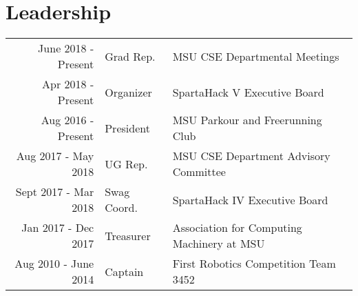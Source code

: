 \documentclass[]{deedy-resume-openfont-rileyannis}
\begin{document}
\begin{minipage}[t]{0.66\textwidth}


\section{Leadership} 

\begin{tabular}{rll}
June 2018 - Present & Grad Rep. & MSU CSE Departmental Meetings\\
Apr 2018 - Present & Organizer & SpartaHack V Executive Board\\
Aug 2016 - Present & President & MSU Parkour and Freerunning Club\\
Aug 2017 - May 2018 & UG Rep. & MSU CSE Department Advisory Committee\\
Sept 2017 - Mar 2018 & Swag Coord. & SpartaHack IV Executive Board\\
Jan 2017 - Dec 2017 & Treasurer & Association for Computing Machinery at MSU\\
Aug 2010 - June 2014 & Captain & First Robotics Competition Team 3452\\
\end{tabular}
\sectionsep

\end{minipage} 
\end{document}

